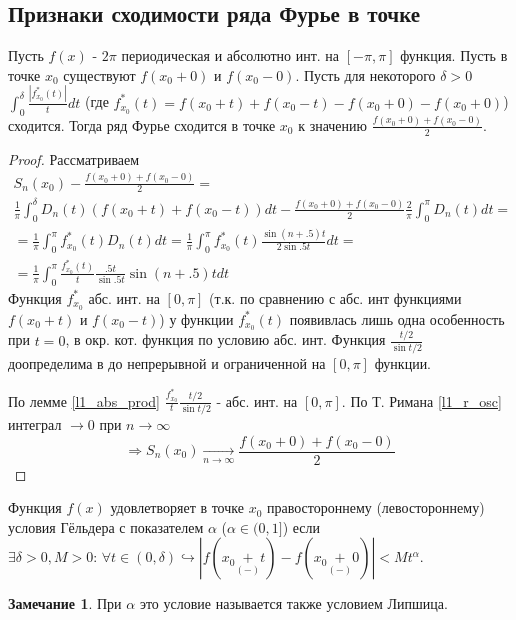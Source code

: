 \documentclass{article}
\theoremstyle{definition}
\numberwithin{theorem}{section}
\numberwithin{lemma}{section}
\numberwithin{definition}{section}
\numberwithin{corollary}{section}
\newtheorem*{remark}{Замечание}
\numberwithin{equation}{section}
\let\implies\Rightarrow
\let\true\hookrightarrow
\begin{document}
\subsection{Признаки сходимости ряда Фурье в точке}
\begin{theorem}
  Пусть $f(x)$ - $2\pi$ периодическая и абсолютно инт. на $[-\pi,\pi]$ функция.
  Пусть  в точке $x_0$ существуют $f(x_0+0)$ и $f(x_0-0)$.
  Пусть для некоторого $\delta>0$ $\int_{0}^{\delta}\frac{|f^*_{x_0}(t)|}{t}dt$
  (где $f^*_{x_0}(t)=f(x_0+t)+f(x_0-t)-f(x_0+0)-f(x_0+0)$) сходится.
  Тогда ряд Фурье сходится в точке $x_0$ к значению $\frac{f(x_0+0)+f(x_0-0)}{2}$.
\end{theorem}
\begin{proof}
  Рассматриваем
  \begin{gather*}
    S_n(x_{0})-\frac{f(x_0+0)+f(x_0-0)}{2}= \\
     \frac{1}{\pi}\int_{0}^{\delta}D_n(t)(f(x_0+t)+f(x_0-t))dt-\frac{f(x_0+0)+f(x_0-0)}{2}\frac{2}{\pi}\int_{0}^{\pi}D_n(t)dt = \\ 
    = \frac{1}{\pi}\int_{0}^{\pi}f^*_{x_0}(t)D_n(t)dt=\frac{1}{\pi}\int_{0}^{\pi}f^*_{x_0}(t)\frac{\sin(n+.5)t}{2\sin.5t}dt = \\
    = \frac{1}{\pi}\int_{0}^{\pi}\frac{f^*_{x_0}(t)}{t}\frac{.5t}{\sin .5t}\sin(n+.5)t dt
  \end{gather*}
  Функция $f^{*}_{x_0}$ абс. инт. на $[0,\pi]$ (т.к. по сравнению с абс. инт функциями
  $f(x_0+t)$ и $f(x_0-t)$) у функции $f^{*}_{x_0}(t)$ появивлась лишь одна
  особенность при $t=0$, в окр. кот. функция по условию абс. инт.
  Функция $\frac{t/2}{\sin t/2}$ доопределима в до непрерывной и ограниченной на
  $[0,\pi]$ функции.

  По лемме \ref{l1_abs_prod} 
  $\frac{f_{x_0}^{*}}{t}\frac{t/2}{\sin t/2}$ - абс. инт. на $[0,\pi]$.
  По Т. Римана \ref{l1_r_osc} 
  интеграл $\to 0$ при $n \to \infty$
  \[
    \implies S_n(x_0) \underset{n\to\infty}{\to}\frac{f(x_0+0)+f(x_0-0)}{2}
  \]
\end{proof}
\begin{definition}
  Функция $f(x)$ удовлетворяет в точке $x_0$ правостороннему (левостороннему)
  условия Гёльдера с показателем $\alpha$ ($\alpha \in (0,1]$)
  если $\exists \delta>0, M>0 :\, \forall t\in(0,\delta) \true |f(x_0\underset{(-)}{+}t)-f(x_0\underset{(-)}{+}0)|<Mt^{\alpha}$.
\end{definition}
\begin{remark}
  При $\alpha$ это условие называется также условием Липшица.
\end{remark}
\end{document}
